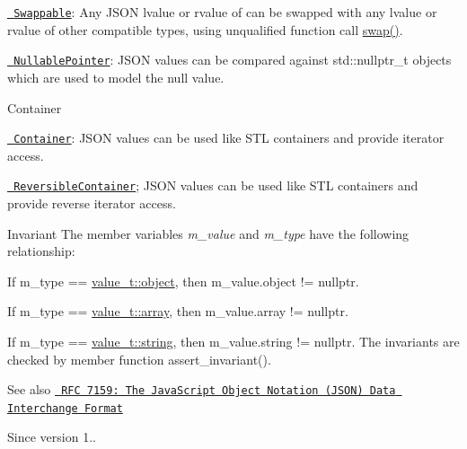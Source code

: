 \begin{DoxyItemize}
\begin{DoxyItemize}
\item \href{http://en.cppreference.com/w/cpp/concept/Swappable}{\texttt{ Swappable}}\+: Any J\+S\+ON lvalue or rvalue of can be swapped with any lvalue or rvalue of other compatible types, using unqualified function call \mbox{\hyperlink{classnlohmann_1_1basic__json_a8c9d932353e1ab98a7dc2fc27e002031}{swap()}}.
\item \href{http://en.cppreference.com/w/cpp/concept/NullablePointer}{\texttt{ Nullable\+Pointer}}\+: J\+S\+ON values can be compared against {\ttfamily std\+::nullptr\+\_\+t} objects which are used to model the {\ttfamily null} value.
\end{DoxyItemize}
\item Container
\begin{DoxyItemize}
\item \href{http://en.cppreference.com/w/cpp/concept/Container}{\texttt{ Container}}\+: J\+S\+ON values can be used like S\+TL containers and provide iterator access.
\item \href{http://en.cppreference.com/w/cpp/concept/ReversibleContainer}{\texttt{ Reversible\+Container}}; J\+S\+ON values can be used like S\+TL containers and provide reverse iterator access.
\end{DoxyItemize}
\end{DoxyItemize}

\begin{DoxyInvariant}{Invariant}
The member variables {\itshape m\+\_\+value} and {\itshape m\+\_\+type} have the following relationship\+:
\begin{DoxyItemize}
\item If {\ttfamily m\+\_\+type == \mbox{\hyperlink{namespacenlohmann_1_1detail_a90aa5ef615aa8305e9ea20d8a947980faa8cfde6331bd59eb2ac96f8911c4b666}{value\+\_\+t\+::object}}}, then {\ttfamily m\+\_\+value.\+object != nullptr}.
\item If {\ttfamily m\+\_\+type == \mbox{\hyperlink{namespacenlohmann_1_1detail_a90aa5ef615aa8305e9ea20d8a947980faf1f713c9e000f5d3f280adbd124df4f5}{value\+\_\+t\+::array}}}, then {\ttfamily m\+\_\+value.\+array != nullptr}.
\item If {\ttfamily m\+\_\+type == \mbox{\hyperlink{namespacenlohmann_1_1detail_a90aa5ef615aa8305e9ea20d8a947980fab45cffe084dd3d20d928bee85e7b0f21}{value\+\_\+t\+::string}}}, then {\ttfamily m\+\_\+value.\+string != nullptr}. The invariants are checked by member function assert\+\_\+invariant().
\end{DoxyItemize}
\end{DoxyInvariant}
\begin{DoxySeeAlso}{See also}
\href{http://rfc7159.net/rfc7159}{\texttt{ R\+FC 7159\+: The Java\+Script Object Notation (J\+S\+ON) Data Interchange Format}}
\end{DoxySeeAlso}
\begin{DoxySince}{Since}
version 1.. 
\end{DoxySince}


